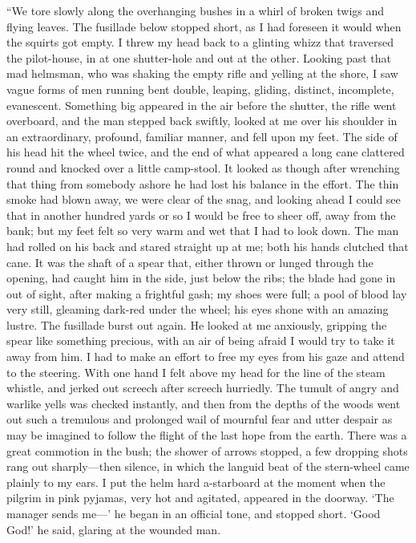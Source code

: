 \documentclass[12pt]{report}
\begin{document}
``We tore slowly along the overhanging bushes in a whirl of broken twigs
and flying leaves. The fusillade below stopped short, as I had foreseen
it would when the squirts got empty. I threw my head back to a glinting
whizz that traversed the pilot-house, in at one shutter-hole and out at
the other. Looking past that mad helmsman, who was shaking the empty
rifle and yelling at the shore, I saw vague forms of men running bent
double, leaping, gliding, distinct, incomplete, evanescent. Something
big appeared in the air before the shutter, the rifle went overboard,
and the man stepped back swiftly, looked at me over his shoulder in an
extraordinary, profound, familiar manner, and fell upon my feet. The
side of his head hit the wheel twice, and the end of what appeared a
long cane clattered round and knocked over a little camp-stool. It
looked as though after wrenching that thing from somebody ashore he had
lost his balance in the effort. The thin smoke had blown away, we were
clear of the snag, and looking ahead I could see that in another hundred
yards or so I would be free to sheer off, away from the bank; but my
feet felt so very warm and wet that I had to look down. The man had
rolled on his back and stared straight up at me; both his hands clutched
that cane. It was the shaft of a spear that, either thrown or lunged
through the opening, had caught him in the side, just below the ribs;
the blade had gone in out of sight, after making a frightful gash; my
shoes were full; a pool of blood lay very still, gleaming dark-red under
the wheel; his eyes shone with an amazing lustre. The fusillade burst
out again. He looked at me anxiously, gripping the spear like something
precious, with an air of being afraid I would try to take it away from
him. I had to make an effort to free my eyes from his gaze and attend to
the steering. With one hand I felt above my head for the line of the
steam whistle, and jerked out screech after screech hurriedly. The
tumult of angry and warlike yells was checked instantly, and then from
the depths of the woods went out such a tremulous and prolonged wail of
mournful fear and utter despair as may be imagined to follow the flight
of the last hope from the earth. There was a great commotion in the
bush; the shower of arrows stopped, a few dropping shots rang out
sharply---then silence, in which the languid beat of the stern-wheel
came plainly to my ears. I put the helm hard a-starboard at the moment
when the pilgrim in pink pyjamas, very hot and agitated, appeared in the
doorway. `The manager sends me---' he began in an official tone, and
stopped short. `Good God!' he said, glaring at the wounded man.
\end{document}
